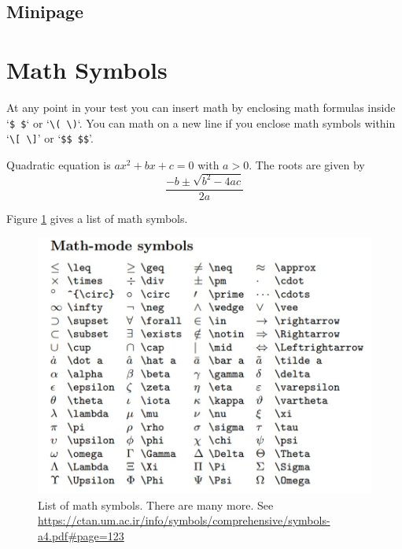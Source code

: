 \documentclass[12pt,twoside,a4paper]{article}
\begin{document}
\subsection{Minipage}
\begin{minipage}{0.45\textwidth}
\blindtext[1]
\end{minipage}
\hspace{0.1\textwidth} %
\begin{minipage}{0.45\textwidth}
\blindtext[1]
\end{minipage}

\vspace{11pt} %

\hspace{0.1\textwidth} %
\begin{minipage}{0.8\textwidth}
\blindtext[1]
\end{minipage}
\hspace{0.1\textwidth} %






\section{Math Symbols}
At any point in your test you can insert math by enclosing math formulas inside `\verb|$ $|` or `\verb|\( \)|`. You can math on a new line if you enclose math symbols within `\verb|\[ \]|' or `\verb|$$ $$|'.

Quadratic equation is $ax^2 + bx + c = 0$ with \( a > 0 \). The roots are given by \[ \frac{-b \pm \sqrt{b^2 - 4ac}}{2a} \]

Figure \ref{fig:math-symbols} gives a list of math symbols.

\begin{figure}[ht]
\centering
\includegraphics[width=6in]{math-symbols.jpg}
\caption{List of math symbols. There are many more. See \url{https://ctan.um.ac.ir/info/symbols/comprehensive/symbols-a4.pdf\#page=123}}
\label{fig:math-symbols}
\end{figure}
\end{document}
